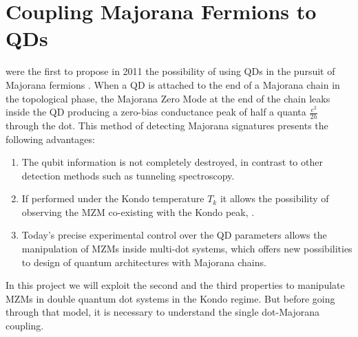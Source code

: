 











\section{Coupling Majorana Fermions to QDs}
\citeauthor{liu_detecting_2011} were the first to propose in 2011 the possibility of using QDs in the pursuit of Majorana fermions . When a QD is attached to the end of a Majorana chain in the topological phase,  the Majorana Zero Mode at the end of the chain leaks inside the QD \cite{vernek_subtle_2014} producing a zero-bias conductance peak of half a quanta $\frac{e^{2}}{2h}$ through the dot.  This method of detecting Majorana signatures presents the following  advantages:

\begin{enumerate}
  \item The qubit information  is not completely destroyed, in contrast to other detection methods such as tunneling spectroscopy.
  \item If performed under the  Kondo temperature $T_k$ it allows the possibility of observing the  MZM co-existing with the Kondo peak, \cite{lee_kondo_2013,ruiz-tijerina_interaction_2015,gorski_interplay_2018} .
  \item Today's precise experimental control over the QD parameters allows the manipulation of MZMs inside multi-dot systems, which offers new possibilities to design of quantum architectures with Majorana chains.\cite{barkeshli_physical_2015,karzig_scalable_2017} 
\end{enumerate}

In this project we will exploit the second and the third properties to manipulate MZMs in double quantum dot systems in the Kondo regime. But before going through that model, it is necessary to understand the single dot-Majorana coupling.

